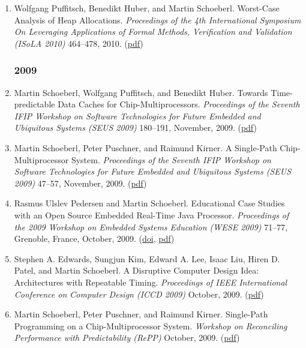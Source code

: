 \begin{enumerate}
\item Wolfgang Puffitsch, Benedikt Huber, and Martin Schoeberl.
 Worst-Case Analysis of Heap Allocations.
 \emph{Proceedings of the 4th International Symposium On Leveraging Applications of Formal Methods, Verification and Validation (ISoLA 2010)} 464--478, 2010.
(\href{http://www.jopdesign.com/doc/wcmem.pdf}{pdf})


\subsubsection*{2009}

\item Martin Schoeberl, Wolfgang Puffitsch, and Benedikt Huber.
 Towards Time-predictable Data Caches for Chip-Multiprocessors.
 \emph{Proceedings of the Seventh IFIP Workshop on Software Technologies for Future Embedded and Ubiquitous Systems (SEUS 2009)} 180--191, November, 2009.
(\href{http://www.jopdesign.com/doc/dcache_seus.pdf}{pdf})

\item Martin Schoeberl, Peter Puschner, and Raimund Kirner.
 A Single-Path Chip-Multiprocessor System.
 \emph{Proceedings of the Seventh IFIP Workshop on Software Technologies for Future Embedded and Ubiquitous Systems (SEUS 2009)} 47--57, November, 2009.
(\href{http://www.jopdesign.com/doc/spcmp_seus.pdf}{pdf})

\item Rasmus Ulslev Pedersen and Martin Schoeberl.
 Educational Case Studies with an Open Source Embedded Real-Time Java Processor.
 \emph{Proceedings of the 2009 Workshop on Embedded Systems Education (WESE 2009)} 71--77, Grenoble, France, October, 2009.
(\href{http://dx.doi.org/10.1145/1719010.1719022}{doi}, \href{http://www.jopdesign.com/doc/jopedu.pdf}{pdf})

\item Stephen A. Edwards, Sungjun Kim, Edward A. Lee, Isaac Liu, Hiren D. Patel, and Martin Schoeberl.
 A Disruptive Computer Design Idea: Architectures with Repeatable Timing.
 \emph{Proceedings of IEEE International Conference on Computer Design (ICCD 2009)} October, 2009.
(\href{http://www.jopdesign.com/doc/pret_iccd.pdf}{pdf})

\item Martin Schoeberl, Peter Puschner, and Raimund Kirner.
 Single-Path Programming on a Chip-Multiprocessor System.
 \emph{Workshop on Reconciling Performance with Predictability (RePP)} October, 2009.
(\href{http://www.jopdesign.com/doc/spcmp_repp.pdf}{pdf})


\end{enumerate}
